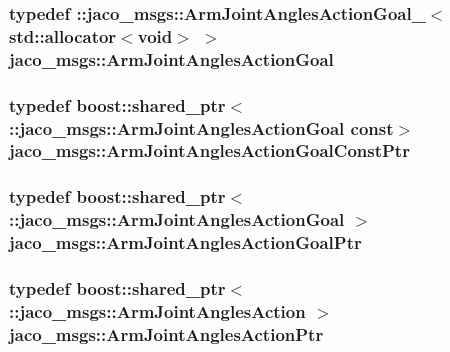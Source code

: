 \subsubsection[{\texorpdfstring{Arm\+Joint\+Angles\+Action\+Goal}{ArmJointAnglesActionGoal}}]{\setlength{\rightskip}{0pt plus 5cm}typedef \+::{\bf jaco\+\_\+msgs\+::\+Arm\+Joint\+Angles\+Action\+Goal\+\_\+}$<$std\+::allocator$<$void$>$ $>$ {\bf jaco\+\_\+msgs\+::\+Arm\+Joint\+Angles\+Action\+Goal}}\hypertarget{namespacejaco__msgs_a470a23a1c9e2f50a7fb922b297d0196d}{}\label{namespacejaco__msgs_a470a23a1c9e2f50a7fb922b297d0196d}
\subsubsection[{\texorpdfstring{Arm\+Joint\+Angles\+Action\+Goal\+Const\+Ptr}{ArmJointAnglesActionGoalConstPtr}}]{\setlength{\rightskip}{0pt plus 5cm}typedef boost\+::shared\+\_\+ptr$<$ \+::{\bf jaco\+\_\+msgs\+::\+Arm\+Joint\+Angles\+Action\+Goal} const$>$ {\bf jaco\+\_\+msgs\+::\+Arm\+Joint\+Angles\+Action\+Goal\+Const\+Ptr}}\hypertarget{namespacejaco__msgs_a13dda2d3f78d7022a00c1ec6e28bc4f5}{}\label{namespacejaco__msgs_a13dda2d3f78d7022a00c1ec6e28bc4f5}
\subsubsection[{\texorpdfstring{Arm\+Joint\+Angles\+Action\+Goal\+Ptr}{ArmJointAnglesActionGoalPtr}}]{\setlength{\rightskip}{0pt plus 5cm}typedef boost\+::shared\+\_\+ptr$<$ \+::{\bf jaco\+\_\+msgs\+::\+Arm\+Joint\+Angles\+Action\+Goal} $>$ {\bf jaco\+\_\+msgs\+::\+Arm\+Joint\+Angles\+Action\+Goal\+Ptr}}\hypertarget{namespacejaco__msgs_afa31432479719cc4ba185bef68605370}{}\label{namespacejaco__msgs_afa31432479719cc4ba185bef68605370}
\subsubsection[{\texorpdfstring{Arm\+Joint\+Angles\+Action\+Ptr}{ArmJointAnglesActionPtr}}]{\setlength{\rightskip}{0pt plus 5cm}typedef boost\+::shared\+\_\+ptr$<$ \+::{\bf jaco\+\_\+msgs\+::\+Arm\+Joint\+Angles\+Action} $>$ {\bf jaco\+\_\+msgs\+::\+Arm\+Joint\+Angles\+Action\+Ptr}}\hypertarget{namespacejaco__msgs_a727d8133fbee8f488ca93cd6e8053e95}{}\label{namespacejaco__msgs_a727d8133fbee8f488ca93cd6e8053e95}
